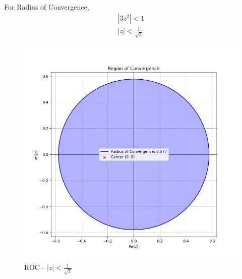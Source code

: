 \documentclass[journal,12pt,twocolumn]{IEEEtran}
\theoremstyle{remark}
\begin{document}
 For Radius of Convergence,
 \begin{align}
|3z^2| < 1\\
|z| < \frac{1}{\sqrt{3}}
 \end{align}
 \begin{figure}[h]
\renewcommand\thefigure{1}
    \centering
    \includegraphics[width=0.8\columnwidth]{figs/fig1.png}
    \caption{ROC - $|z|< \frac{1}{\sqrt{3}}$}
    \label{Fig1_GATE MA 28}
\end{figure}
\end{document}
